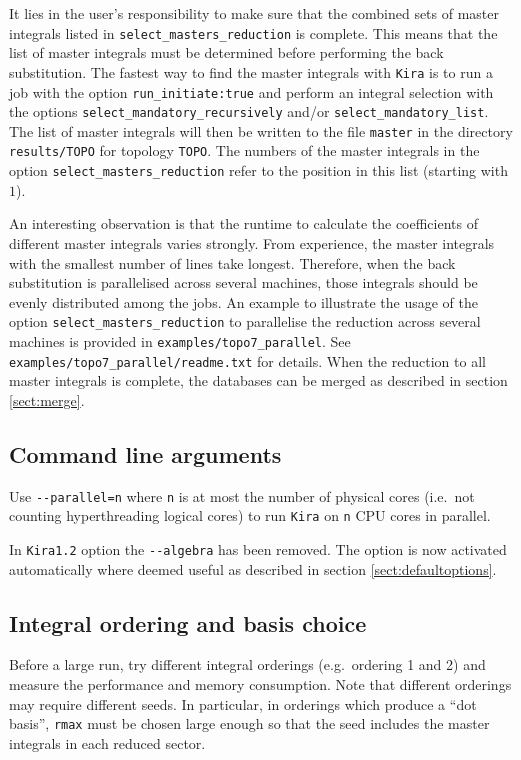 \documentclass[a4paper,12pt]{article}
\newcommand*{\kira}{\texttt{Kira}}
\begin{document}
It lies in the user's responsibility to make sure that the combined sets of
master integrals listed in \texttt{select\_masters\_reduction} is complete.
This means that the list of master integrals must be determined before
performing the back substitution.
The fastest way to find the master integrals with \kira{} is to run a job with
the option \texttt{run\_initiate:\;true} and perform an integral selection with
the options \texttt{select\_mandatory\_recursively} and/or
\texttt{select\_mandatory\_list}.
The list of master integrals will then be written to the file \texttt{master} in
the directory \texttt{results/TOPO} for topology \texttt{TOPO}.
The numbers of the master integrals in the option
\texttt{select\_masters\_reduction} refer to the position in this list (starting
with $1$).

An interesting observation is that the runtime to calculate the coefficients of
different master integrals varies strongly.
From experience, the master integrals with the smallest number of lines take
longest.
Therefore, when the back substitution is parallelised across several machines,
those integrals should be evenly distributed among the jobs.
An example to illustrate the usage of the option
\texttt{select\_masters\_reduction} to parallelise the reduction across several
machines is provided in \texttt{examples/topo7\_parallel}. See
\texttt{examples/topo7\_parallel/readme.txt} for details.
When the reduction to all master integrals is complete, the databases can be
merged as described in section \ref{sect:merge}.


\subsection{Command line arguments}

Use \texttt{-{}-parallel=n} where \texttt{n} is at most the number of physical
cores (i.e.\ not counting hyperthreading logical cores) to run \kira{} on
\texttt{n} CPU cores in parallel.

In \kira{}\;\texttt{1.2} option the \texttt{-{}-algebra} has been removed.
The option is now activated automatically where deemed useful as described in
section \ref{sect:defaultoptions}.


\subsection{Integral ordering and basis choice}

Before a large run, try different integral orderings (e.g.\ ordering 1 and 2)
and measure the performance and memory consumption. Note that different
orderings may require different seeds.
In particular, in orderings which produce a ``dot basis'', \texttt{rmax} must be
chosen large enough so that the seed includes the master integrals in each
reduced sector.
\end{document}
